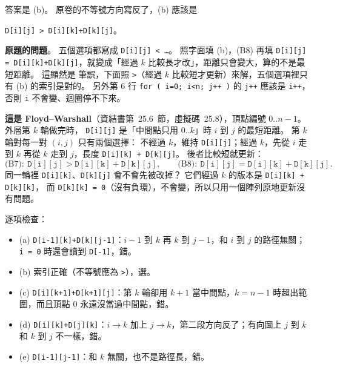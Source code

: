 \begin{pastsoln}
答案是 (b)。 原卷的不等號方向寫反了，(b) 應該是
\begin{center}
\texttt{D[i][j] > D[i][k]+D[k][j]}。
\end{center}

\textbf{原題的問題}。 五個選項都寫成 \texttt{D[i][j] < \ldots}。 照字面填 (b)，(B8) 再填
\texttt{D[i][j] = D[i][k]+D[k][j]}，就變成「經過 $k$ 比較長才改」，距離只會變大，算的不是最短距離。 這顯然是
筆誤，下面照 \texttt{>}（經過 $k$ 比較短才更新）來解，五個選項裡只有 (b) 的索引是對的。 另外第 6 行
\texttt{for ( i=0; i<n; j++ )} 的 \texttt{j++} 應該是 \texttt{i++}，否則 \texttt{i} 不會變、迴圈停不下來。

\textbf{這是 Floyd--Warshall}（資結書第~25.6~節，虛擬碼~25.8），頂點編號 $0..n-1$。 外層第 $k$ 輪做完時，
\texttt{D[i][j]} 是「中間點只用 $0..k$」時 $i$ 到 $j$ 的最短距離。 第 $k$ 輪對每一對 $(i, j)$ 只有兩個選擇：
不經過 $k$，維持 \texttt{D[i][j]}；經過 $k$，先從 $i$ 走到 $k$ 再從 $k$ 走到 $j$，長度
\texttt{D[i][k] + D[k][j]}。 後者比較短就更新：
\[
\text{(B7)}\colon\ \mathtt{D[i][j] > D[i][k] + D[k][j]}, \qquad
\text{(B8)}\colon\ \mathtt{D[i][j] = D[i][k] + D[k][j]}.
\]
同一輪裡 \texttt{D[i][k]}、\texttt{D[k][j]} 會不會先被改掉？ 它們經過 $k$ 的版本是 \texttt{D[i][k] + D[k][k]}，
而 \texttt{D[k][k] = 0}（沒有負環），不會變，所以只用一個陣列原地更新沒有問題。

逐項檢查：
\begin{itemize}
\item (a) \texttt{D[i-1][k]+D[k][j-1]}：$i - 1$ 到 $k$ 再 $k$ 到 $j - 1$，和 $i$ 到 $j$ 的路徑無關；
\texttt{i = 0} 時還會讀到 \texttt{D[-1]}，錯。
\item (b) 索引正確（不等號應為 \texttt{>}），選。
\item (c) \texttt{D[i][k+1]+D[k+1][j]}：第 $k$ 輪卻用 $k + 1$ 當中間點，$k = n - 1$ 時超出範圍，而且頂點 $0$
永遠沒當過中間點，錯。
\item (d) \texttt{D[i][k]+D[j][k]}：$i \to k$ 加上 $j \to k$，第二段方向反了；有向圖上 $j$ 到 $k$ 和 $k$ 到 $j$
不一樣，錯。
\item (e) \texttt{D[i-1][j-1]}：和 $k$ 無關，也不是路徑長，錯。
\end{itemize}
\end{pastsoln}

